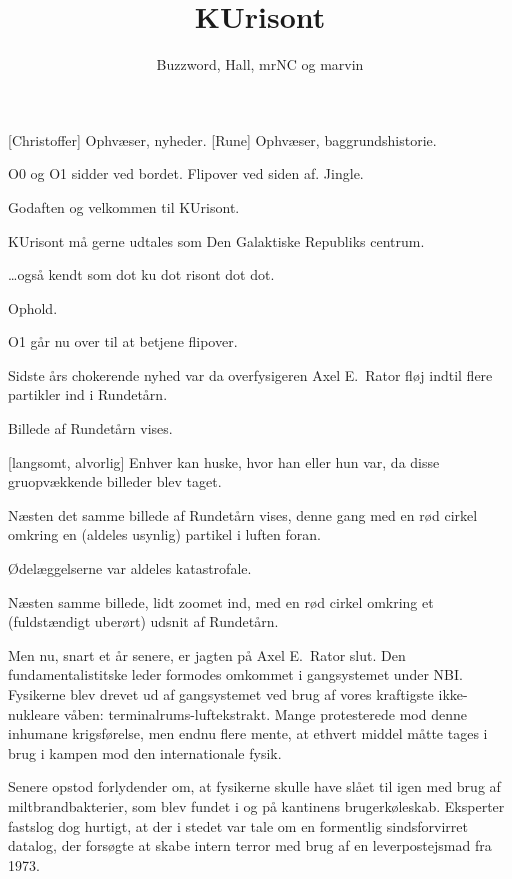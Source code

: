 \documentclass[a4paper]{article}
\title{KUrisont}
\author{Buzzword, Hall, mrNC og marvin}
\begin{document}
\maketitle

\begin{roles}
[Christoffer] Ophvæser, nyheder.
[Rune] Ophvæser, baggrundshistorie.
\end{roles}

\begin{props}
\end{props}

\begin{sketch}

\scene O0 og O1 sidder ved bordet. Flipover ved siden af.
\scene Jingle.

 Godaften og velkommen til KUrisont.

\scene KUrisont må gerne udtales som Den Galaktiske Republiks centrum.

\ldots også kendt som dot ku dot risont dot dot.

\scene Ophold.

\scene O1 går nu over til at betjene flipover.

Sidste års chokerende nyhed var da overfysigeren Axel E.\ Rator fløj 
indtil flere partikler ind i Rundetårn.

\scene
Billede af Rundetårn vises.

[langsomt, alvorlig]
Enhver kan huske, hvor han eller hun
var, da disse gruopvækkende billeder blev taget.

\scene
Næsten det samme billede af Rundetårn vises, denne gang med en rød
cirkel omkring en (aldeles usynlig) partikel i luften foran.

Ødelæggelserne var aldeles katastrofale.

\scene
Næsten samme billede, lidt zoomet ind, med en rød cirkel omkring et
(fuldstændigt uberørt) udsnit af Rundetårn.

Men nu, snart et år senere, er jagten på Axel E.\ Rator
slut. Den fundamentalistitske leder formodes omkommet i gangsystemet under NBI.
Fysikerne blev drevet ud af gangsystemet ved brug af vores
kraftigste ikke-nukleare våben: terminalrums-luftekstrakt.
Mange protesterede mod denne inhumane krigsførelse,
men endnu flere mente, at ethvert middel måtte tages i brug
i kampen mod den internationale fysik.

Senere opstod forlydender om, at fysikerne skulle have slået til igen
med brug af miltbrandbakterier, som blev fundet i og på
kantinens brugerkøleskab.
Eksperter fastslog dog hurtigt, at der i stedet var tale om en
formentlig sindsforvirret datalog, der forsøgte at skabe intern terror
med brug af en leverpostejsmad fra 1973.


\end{sketch}
\end{document}
